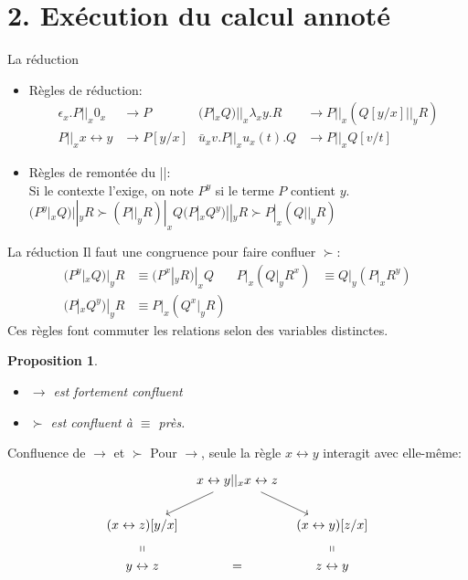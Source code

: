 \documentclass[11pt]{beamer}
\newcommand{\tto}{\leftrightarrow}
\newtheorem{prop}{Proposition}
\begin{document}
\section{2. Exécution du calcul annoté}

\begin{frame}{La réduction}
\begin{itemize}
\item Règles de réduction:
\begin{align*}
\epsilon_x.P ||_x 0_x &\to P & (P|_xQ)||_x\lambda_xy.R &\to P||_x(Q[y/x]||_yR)\\
P||_x x\tto y &\to P[y/x] & \bar{u}_xv.P||_xu_x(t).Q &\to P||_x Q[v/t]
\end{align*}
\pause\item Règles de remontée du ||:\\
Si le contexte l'exige, on note $P^y$ si le terme $P$ contient $y$.\\
$(P^y|_xQ)||_yR \succ (P||_yR)|_xQ$\hfill$(P|_xQ^y)||_yR \succ P|_x(Q||_yR)$
\end{itemize}
\end{frame}

\begin{frame}{La réduction}
Il faut une congruence pour faire confluer $\succ$:
\begin{align*}
(P^y|_xQ)|_yR &\equiv (P^x|_yR)|_xQ & P|_x(Q|_yR^x) &\equiv Q|_y(P|_xR^y)\\
(P|_xQ^y)|_yR &\equiv P|_x(Q^x|_yR)
\end{align*}
Ces règles font commuter les relations selon des variables distinctes.
\begin{prop}
\begin{itemize}
\item $\to$ est fortement confluent
\item $\succ$ est confluent à $\equiv$ près.
\end{itemize}
\end{prop}
\end{frame}

\begin{frame}{Confluence de $\to$ et $\succ$}
Pour $\to$, seule la règle $x \tto y$ interagit avec elle-même:
\[\begin{tikzcd}[ampersand replacement=\&, column sep=tiny]
\& x\tto y ||_x x\tto z \arrow[dl] \arrow[dr] \&\\
(x\tto z)[y/x]\arrow[d, phantom, "\shortparallel"] \& \& (x\tto y)[z/x]\arrow[d, phantom, "\shortparallel"]\\
y\tto z \& = \& z\tto y
\end{tikzcd}\]
\end{frame}
\end{document}
